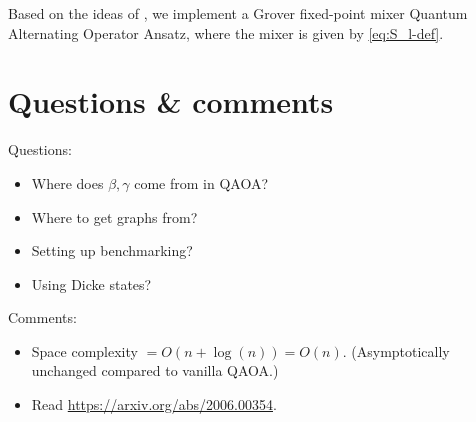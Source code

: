 \documentclass[reqno,oneside,12pt]{amsart}  %
\numberwithin{equation}{section}                %
\begin{document}
Based on the ideas of \cite{bartschi_grover_2020}, we implement a Grover fixed-point mixer Quantum Alternating Operator Ansatz, where the mixer is given by \cref{eq:S_l-def}.


\bigskip

\section{Questions \& comments}

\noindent Questions:
\begin{itemize}
   \item Where does $\beta, \gamma$ come from in QAOA?
   \item Where to get graphs from?
   \item Setting up benchmarking?
   \item Using Dicke states?
\end{itemize}

\noindent Comments:
\begin{itemize}
   \item Space complexity $= O(n + \log(n)) = O(n)$. (Asymptotically unchanged compared to vanilla QAOA.)
   \item Read \href{arXiv:2006.00354v2}{https://arxiv.org/abs/2006.00354}.
\end{itemize}





   
\end{document}
